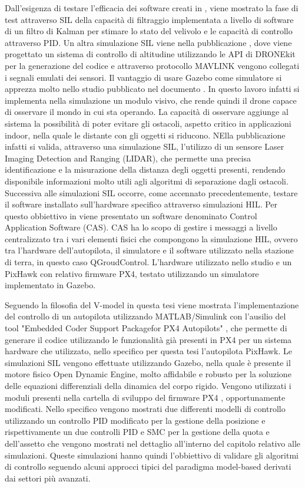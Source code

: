 Dall'esigenza di testare l'efficacia dei software creati in \cite{SIL_perform}, viene mostrato la fase di test attraverso SIL della capacità di filtraggio implementata a livello di software di un filtro di Kalman per stimare lo stato del velivolo e le capacità di controllo attraverso PID. Un altra simulazione SIL viene nella pubblicazione \cite{SIL_design}, dove viene progettato un sistema di controllo di altitudine utilizzando le API di DRONEkit per la generazione del codice e attraverso protocollo MAVLINK vengono collegati i segnali emulati dei sensori.
Il vantaggio di usare Gazebo come simulatore si apprezza molto nello studio pubblicato nel documento \cite{Vision_base}. In questo lavoro infatti si implementa nella simulazione un modulo visivo, che rende quindi il drone capace di osservare il mondo in cui sta operando. La capacità di osservare aggiunge al sistema la possibilità di poter evitare gli ostacoli, aspetto critico in applicazioni indoor, nella quale le distante con gli oggetti si riducono. NElla pubblicazione \cite{SIL_obstacle} infatti si valida, attraverso una simulazione SIL, l'utilizzo di un sensore Laser Imaging Detection and Ranging (LIDAR), che permette una precisa identificazione e la misurazione della distanza degli oggetti presenti, rendendo disponibile informazioni molto utili agli algoritmi di separazione dagli ostacoli.
Successiva alle simulazioni SIL occorre, come accennato precedentemente, testare il software installato sull'hardware specifico attraverso simulazioni HIL. Per questo obbiettivo in \cite{HIL_Dev} viene presentato un software denominato Control Application Software (CAS). CAS ha lo scopo di gestire i messaggi a livello centralizzato tra i vari elementi fisici che compongono la simulazione HIL, ovvero tra l'hardware dell'autopilota, il simulatore e il software utilizzato nella stazione di terra, in questo caso QGroudControl. L'hardware utilizzato nello studio e un PixHawk con relativo firmware PX4, testato utilizzando un simulatore implementato in Gazebo.

Seguendo la filosofia del V-model in questa tesi viene mostrata l'implementazione del controllo di un autopilota utilizzando MATLAB/Simulink con l'ausilio del tool "Embedded Coder Support Packagefor PX4 Autopilots" \cite{toolPx4}, che permette di generare il codice utilizzando le funzionalità già presenti in PX4 per un sistema hardware che utilizzato, nello specifico per questa tesi l'autopilota PixHawk. Le simulazioni SIL vengono effettuate utilizzando Gazebo, nella quale è presente il motore fisico Open Dynamic Engine, molto affidabile e robusto per la soluzione delle equazioni differenziali della dinamica del corpo rigido. Vengono utilizzati i moduli presenti nella cartella di sviluppo del firmware PX4 \cite{px4Firmware}, opportunamente modificati. Nello specifico vengono mostrati due differenti modelli di controllo utilizzando un controllo PID modificato per la gestione della posizione e rispettivamente un due controlli PID e SMC per la gestione della quota e dell'assetto che vengono mostrati nel dettaglio all'interno del capitolo relativo alle simulazioni. Queste simulazioni hanno quindi l'obbiettivo di validare gli algoritmi di controllo seguendo alcuni approcci tipici del paradigma model-based derivati dai settori più avanzati.


